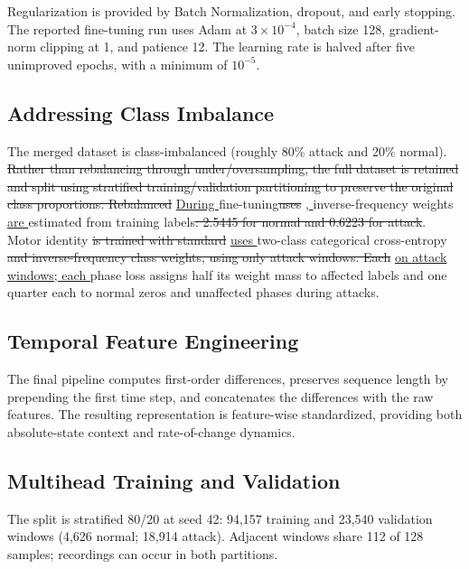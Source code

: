 \documentclass[conference,letterpaper]{IEEEtran}
\providecommand{\DIFadd}[1]{{\protect\color{blue}\uline{#1}}} %
\providecommand{\DIFdel}[1]{{\protect\color{red}\sout{#1}}}                      %
\providecommand{\DIFaddbegin}{} %
\providecommand{\DIFaddend}{} %
\providecommand{\DIFdelbegin}{} %
\providecommand{\DIFdelend}{} %
\begin{document}
Regularization is provided by Batch Normalization, dropout, and early stopping. The reported fine-tuning run uses Adam at $3\times10^{-4}$, batch size 128, gradient-norm clipping at 1, and patience 12. The learning rate is halved after five unimproved epochs, with a minimum of $10^{-5}$.

\subsection{Addressing Class Imbalance}

The merged dataset is class-imbalanced (roughly 80\% attack and 20\% normal). \DIFdelbegin \DIFdel{Rather than rebalancing through under/oversampling, the full dataset is retained and split using stratified training/validation partitioning to preserve the original class proportions. Rebalanced }\DIFdelend \DIFaddbegin \DIFadd{During }\DIFaddend fine-tuning\DIFdelbegin \DIFdel{uses }\DIFdelend \DIFaddbegin \DIFadd{, }\DIFaddend inverse-frequency weights \DIFaddbegin \DIFadd{are }\DIFaddend estimated from training labels\DIFdelbegin \DIFdel{: 2.5445 for normal and 0.6223 for attack}\DIFdelend . Motor identity \DIFdelbegin \DIFdel{is trained with standard }\DIFdelend \DIFaddbegin \DIFadd{uses }\DIFaddend two-class categorical cross-entropy \DIFdelbegin \DIFdel{and inverse-frequency class weights, using only attack windows. Each }\DIFdelend \DIFaddbegin \DIFadd{on attack windows; each }\DIFaddend phase loss assigns half its weight mass to affected labels and one quarter each to normal zeros and unaffected phases during attacks.

\subsection{Temporal Feature Engineering}
The final pipeline computes first-order differences, preserves sequence length by prepending the first time step, and concatenates the differences with the raw features. The resulting representation is feature-wise standardized, providing both absolute-state context and rate-of-change dynamics.


\subsection{Multihead Training and Validation}
The split is stratified 80/20 at seed 42: 94,157 training and 23,540 validation windows (4,626 normal; 18,914 attack). Adjacent windows share 112 of 128 samples; recordings can occur in both partitions.
\end{document}
